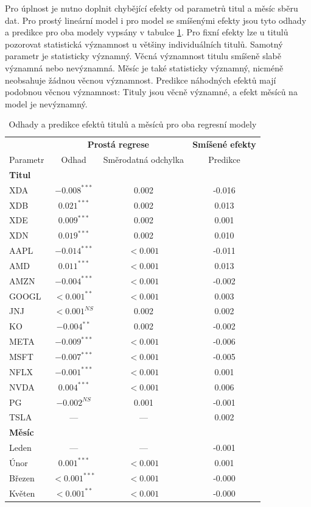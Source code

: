 \documentclass[male,czech,api_bc]{kitheses}
\begin{document}
  Pro úplnost je nutno doplnit chybějící efekty od parametrů titul a měsíc sběru dat. Pro prostý lineární model i pro model se smíšenými efekty jsou tyto odhady a predikce pro oba modely vypsány v tabulce \ref{tab:your_dad}.
  Pro fixní efekty lze u titulů pozorovat statistická významnost u většiny individuálních titulů. Samotný parametr je statisticky významný. Věcná významnost titulu smíšeně slabě významná nebo nevýznamná. Měsíc je také statisticky významný, nicméně neobsahuje žádnou věcnou významnost.
  Predikce náhodných efektů mají podobnou věcnou významnost: Tituly jsou věcně významné, a efekt měsíců na model je nevýznamný.

  \begin{table}[h!]
    \centering
    \caption{Odhady a predikce efektů titulů a měsíců pro oba regresní modely}
    \label{tab:your_dad}
    \begin{tabular}{lcc|c}
      \toprule
      & \multicolumn{2}{c}{\textbf{Prostá regrese}} & \textbf{Smíšené efekty} \\
      Parametr & Odhad & Směrodatná odchylka & Predikce \\
      \midrule
      \multicolumn{4}{l}{\textbf{Titul}} \\
      XDA & $-0.008^{***}$ & 0.002 & -0.016 \\
      XDB & $0.021^{***}$ & 0.002 & 0.013 \\
      XDE & $0.009^{***}$ & 0.002 & 0.001 \\
      XDN & $0.019^{***}$ & 0.002 & 0.010 \\
      AAPL & $-0.014^{***}$ & $<0.001$ & -0.011 \\
      AMD & $0.011^{***}$ & $<0.001$ & 0.013 \\
      AMZN & $-0.004^{***}$ & $<0.001$ & -0.002 \\
      GOOGL & $<0.001^{**}$ & $<0.001$ & 0.003 \\
      JNJ & $<0.001^{NS}$ & 0.002 & 0.002 \\
      KO & $-0.004^{**}$ & 0.002 & -0.002 \\
      META & $-0.009^{***}$ & $<0.001$ & -0.006 \\
      MSFT & $-0.007^{***}$ & $<0.001$ & -0.005 \\
      NFLX & $-0.001^{***}$ & $<0.001$ & 0.001 \\
      NVDA & $0.004^{***}$ & $<0.001$ & 0.006 \\
      PG & $-0.002^{NS}$ & 0.001 & -0.001 \\
      TSLA & --- & --- & 0.002 \\
      \midrule
      \multicolumn{4}{l}{\textbf{Měsíc}} \\
      Leden & --- & --- & -0.001 \\
      Únor & $0.001^{***}$ & $<0.001$ & 0.001 \\
      Březen & $<0.001^{***}$ & $<0.001$ & -0.000 \\
      Květen & $<0.001^{**}$ & $<0.001$ & -0.000 \\
      \bottomrule
    \end{tabular}
  \end{table}
\end{document}
